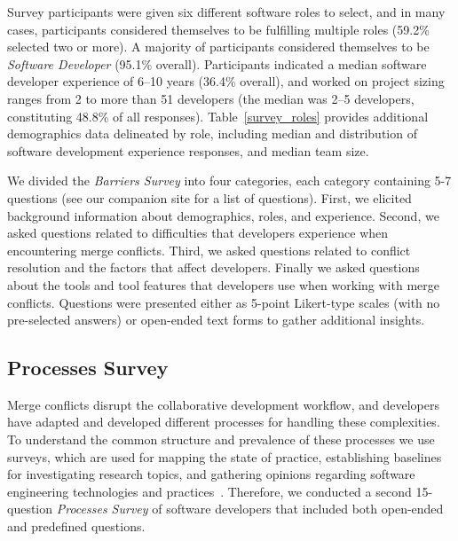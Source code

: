 Survey participants were given six different software roles to select, and in many cases, participants considered themselves to be fulfilling multiple roles (59.2\% selected two or more).
A majority of participants considered themselves to be \textit{Software Developer} (95.1\% overall).
Participants indicated a median software developer experience of 6--10 years (36.4\% overall), and worked on project sizing ranges from 2 to more than 51 developers (the median was 2--5 developers, constituting 48.8\% of all responses).
Table~\ref{survey_roles} provides additional demographics data delineated by role, including median and distribution of software development experience responses, and median team size.

We divided the \textit{Barriers Survey} into four categories, each category containing 5-7 questions (see our companion site for a list of questions).
First, we elicited background information about demographics, roles, and experience.
Second, we asked questions related to difficulties that developers experience when encountering merge conflicts.
Third, we asked questions related to conflict resolution and the factors that affect developers.
Finally we asked questions about the tools and tool features that developers use when working with merge conflicts.
Questions were presented either as 5-point Likert-type scales (with no pre-selected answers) or open-ended text forms to gather additional insights.

\subsection{Processes Survey}\label{processes_survey}

Merge conflicts disrupt the collaborative development workflow, and developers have adapted and developed different processes for handling these complexities.
To understand the common structure and prevalence of these processes we use surveys, which are used for mapping the state of practice, establishing baselines for investigating research topics, and gathering opinions regarding software engineering technologies and practices~\cite{deMello2016survey}.
Therefore, we conducted a second 15-question \textit{Processes Survey} of software developers that included both open-ended and predefined questions.

